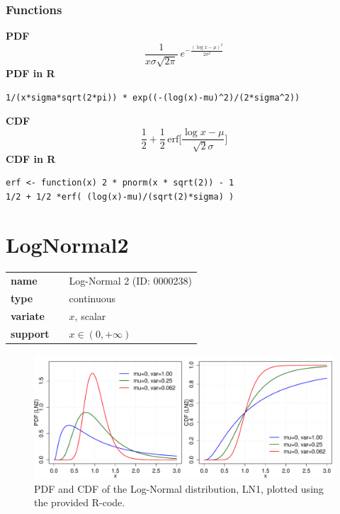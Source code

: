 \subsubsection*{Functions}

\smallskip \noindent \hspace{.2cm} \textbf{PDF} 
\begin{equation*}\frac{1}{x\sigma\sqrt{2\pi}}\ e^{-\frac{\left(\log x-\mu\right)^2}{2\sigma^2}}\end{equation*}
\smallskip \noindent \hspace{.2cm} \textbf{PDF in R}  
\begin{verbatim}1/(x*sigma*sqrt(2*pi)) * exp((-(log(x)-mu)^2)/(2*sigma^2))\end{verbatim}
\smallskip \noindent \hspace{.2cm} \textbf{CDF} 
\begin{equation*}\frac12 + \frac12\,\text{erf}\Big[\frac{\log x-\mu}{\sqrt{2}\sigma}\Big]\end{equation*}
\smallskip \noindent \hspace{.2cm} \textbf{CDF in R} 
\begin{verbatim}
erf <- function(x) 2 * pnorm(x * sqrt(2)) - 1
1/2 + 1/2 *erf( (log(x)-mu)/(sqrt(2)*sigma) )\end{verbatim}
\smallskip\section*{LogNormal2} 

  \bigskip 

\begin{tabular}{p{2cm}cl}
\textbf{name} & & Log-Normal 2 (ID: 0000238)\\ 
 
\textbf{type} & & continuous \\ 

\textbf{variate} & & $x$, scalar \\ 

\textbf{support} & & $x \in (0,+\infty)$
\end{tabular}

\begin{figure}[htb!]
\centering
  \includegraphics[width=140mm]{pics/LogNormal2_pdf_cdf.pdf}
 \caption{PDF and CDF of the Log-Normal distribution, LN1,
 plotted using the provided R-code.}
 \label{fig:LN2pdfcdf}
\end{figure}

